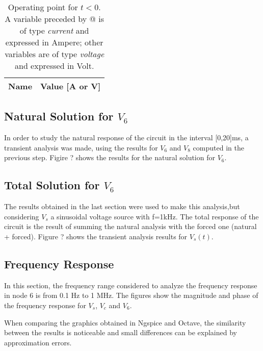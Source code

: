 
\begin{table}[h]
  \centering
  \begin{tabular}{|l|r|}
    \hline    
    {\bf Name} & {\bf Value [A or V]} \\ \hline
    
  \end{tabular}
  \caption{Operating point for $t<0$. A variable preceded by @ is of type {\em current}
    and expressed in Ampere; other variables are of type {\it voltage} and expressed in
    Volt.}
  \label{tab:op}
\end{table}

\subsection{Natural Solution for $V_6$}

In order to study the natural response of the circuit in the interval [0,20]ms, a transient analysis was made, using the results for $V_6$ and $V_8$ computed in the previous step. Figire ? shows the results for the natural solution for $V_6$.


\subsection{Total Solution for $V_6$}

The results obtained in the last section were used to make this analysis,but considering $V_s$ a sinusoidal voltage source with f=1kHz. The total response of the circuit is the result of summing the natural analysis with the forced one (natural + forced). 
Figure ? shows the transient analysis results for $V_s(t)$.


\subsection{Frequency Response}


In this section, the frequency range considered to analyze the frequency response in node 6 is from 0.1 Hz to 1 MHz. The figures show the magnitude and phase of the frequency response for $V_s$, $V_c$ and $V_6$.


When comparing the graphics obtained in Ngspice and Octave, the similarity between the results is noticeable and small differences can be explained by approximation errors.





